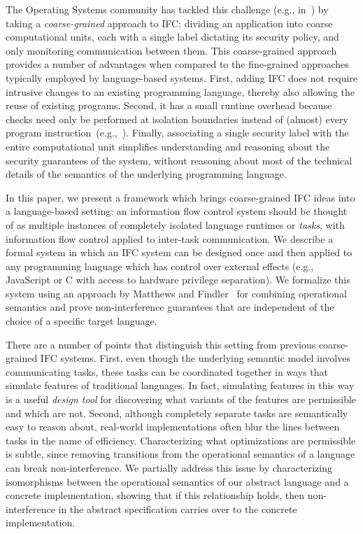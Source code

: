 \documentclass{llncs}
\begin{document}
The Operating Systems community has tackled this challenge (e.g.,
in~\cite{Zeldovich:2006}) by taking a \textit{coarse-grained} approach
to IFC: dividing an application into coarse computational units,
each with a single label dictating its security policy, and only
monitoring communication between them.
This coarse-grained approach provides a number of advantages when
compared to the fine-grained approaches typically employed by language-based systems.
First, adding IFC does not require intrusive changes to an
existing programming language, thereby also allowing
the reuse of existing programs.  Second, it has a small
runtime overhead because checks need only
be performed at isolation boundaries
instead of (almost) every program instruction~(e.g.,~\cite{JSFlow}).
Finally, associating
a single security label with the entire computational unit simplifies
understanding and reasoning about the security guarantees of the
system, without reasoning about most of the
technical details of the semantics of the underlying programming language.

In this paper, we present a framework which brings coarse-grained IFC
ideas into a language-based setting:
an information flow control system should
be thought of as multiple instances of completely isolated language
runtimes or \emph{tasks}, with information flow control applied to
inter-task communication.  We describe a formal system in which an IFC
system can be designed once and then applied to any programming language
which has control over external effects (e.g., JavaScript or C with
access to hardware privilege separation).  We formalize this system
using an approach by
Matthews and Findler~\cite{Matthews:2007:OSM:1190216.1190220} for combining
operational semantics and prove non-interference guarantees
that are independent of the choice of a specific target language.

There are a number of points that distinguish this setting from
previous coarse-grained IFC systems.
First, even though the underlying semantic model involves communicating
tasks, these tasks can be coordinated together in ways that simulate
features of traditional languages.
In fact, simulating
features in this way is a useful \emph{design tool} for discovering
what variants of the features are permissible and which are not.
Second, although completely separate tasks are semantically easy to
reason about, real-world implementations often blur the lines between
tasks in the name of efficiency.
Characterizing what optimizations are permissible is subtle, since
removing transitions from the operational semantics of a language can
break non-interference.  We partially address this issue
by characterizing isomorphisms between the operational semantics of our
abstract language and a concrete implementation, showing that if this
relationship holds, then non-interference in the abstract specification
carries over to the concrete implementation.
\end{document}

